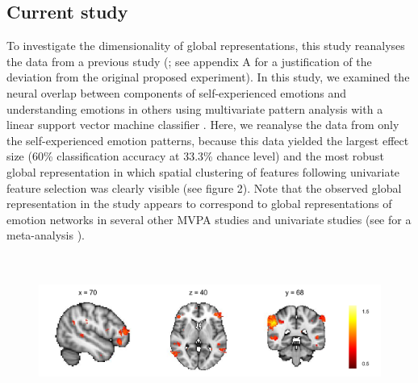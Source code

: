 \documentclass[jou,12pt,a4paper]{apa6}
\begin{document}
\subsection{Current study}
\noindent To investigate the dimensionality of global representations, this study reanalyses the data from a previous study (; see appendix A for a justification of the deviation from the original proposed experiment). In this study, we examined the neural overlap between components of self-experienced emotions and understanding emotions in others using multivariate pattern analysis with a linear support vector machine classifier \cite{chang2011}. Here, we reanalyse the data from only the self-experienced emotion patterns, because this data yielded the largest effect size (60\% classification accuracy at 33.3\% chance level) and the most robust global representation in which spatial clustering of features following univariate feature selection was clearly visible (see figure 2). Note that the observed global representation in the  study appears to correspond to global representations of emotion networks in several other MVPA studies \cite{kassam2013,saarimaki2015,kragel2015} and univariate studies (see for a meta-analysis ).

\begin{figure}[ht]
\centering
\includegraphics[width=\textwidth,height=5cm]{UnivariateFeatureSelection}
\end{figure}
\end{document}
